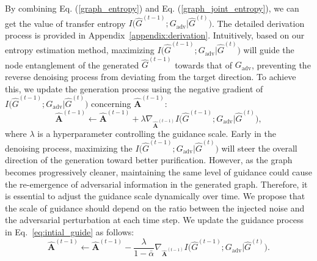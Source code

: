 By combining Eq. (\ref{graph_entropy}) and Eq. (\ref{graph_joint_entropy}), we can get the value of transfer entropy $I\big(\hat{G}^{(t-1)}; G_{\text{adv}} | \hat{G}^{(t)}\big)$. The detailed derivation process is provided in Appendix~\ref{appendix:derivation}. Intuitively, based on our entropy estimation method, maximizing $I\big(\hat{G}^{(t-1)}; G_{\text{adv}} | \hat{G}^{(t)}\big)$ will guide the node entanglement of the generated $\hat{G}^{(t-1)}$ towards that of $G_{\text{adv}}$, preventing the reverse denoising process from deviating from the target direction. To achieve this, we update the generation process using the negative gradient of $I\big(\hat{G}^{(t-1)}; G_{\text{adv}} | \hat{G}^{(t)}\big)$ concerning $\hat{\mathbf{A}}^{(t-1)}$:
\begin{equation}
\label{eq:intial_guide}
    \hat{\mathbf{A}}^{(t-1)} \leftarrow \hat{\mathbf{A}}^{(t-1)} + \lambda \nabla_{\hat{\mathbf{A}}^{(t-1)}} I\big(\hat{G}^{(t-1)}; G_{\text{adv}} | \hat{G}^{(t)}\big),
\end{equation}
where $\lambda$ is a hyperparameter controlling the guidance scale. Early in the denoising process, maximizing the $I\big(\hat{G}^{(t-1)}; G_{\text{adv}} | \hat{G}^{(t)}\big)$ will steer the overall direction of the generation toward better purification. However, as the graph becomes progressively cleaner, maintaining the same level of guidance could cause the re-emergence of adversarial information in the generated graph. Therefore, it is essential to adjust the guidance scale dynamically over time. 
We propose that the scale of guidance should depend on the ratio between the injected noise and the adversarial perturbation at each time step. 
We update the guidance process in Eq.~\eqref{eq:intial_guide} as follows:
\begin{equation}
\label{equation_guide_generation}
    \hat{\mathbf{A}}^{(t-1)} \leftarrow \hat{\mathbf{A}}^{(t-1)} - \frac{\lambda}{1-\bar{\alpha}} \nabla_{\hat{\mathbf{A}}^{(t-1)}} I\big(\hat{G}^{(t-1)}; G_{\text{adv}} | \hat{G}^{(t)}\big).
\end{equation}




